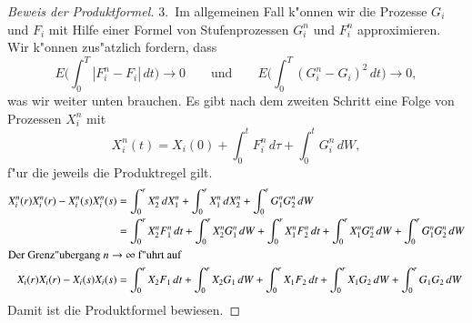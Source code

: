 \begin{proof}[Beweis der Produktformel]
3.~Im allgemeinen Fall k"onnen wir die Prozesse $G_i$ und $F_i$ mit Hilfe
einer Formel von Stufenprozessen $G_i^n$ und $F_i^n$ approximieren.
Wir k"onnen zus"atzlich fordern, dass
\[
E\biggl(\int_0^T |F_i^n-F_i|\,dt\biggr)\to 0
\qquad\text{und}\qquad
E\biggl(\int_0^T (G_i^n-G_i)^2\,dt\biggr)\to 0,
\]
was wir weiter unten brauchen.
Es gibt nach dem zweiten Schritt eine Folge von Prozessen $X_i^n$ mit
\[
X_i^n(t) = X_i(0) + \int_0^t F_i^n\,d\tau + \int_0^t G_i^n\,dW,
\]
f"ur die jeweils die Produktregel gilt.
\begin{align*}
X_i^n(r)X_i^n(r)-X_i^n(s)X_i^n(s)
&=
\int_0^r X_2^n\,dX_1^n+\int_0^r X_1^n\,dX_2^n + \int_0^r G_1^nG_2^n\,dW
\\
&=
\int_0^r X_2^nF_1^n\,dt
+
\int_0^r X_2^nG_1^n\,dW
+
\int_0^r X_1^nF_2^n\,dt
+
\int_0^r X_1^nG_2^n\,dW
+
\int_0^r G_1^nG_2^n\,dW
\\
\intertext{Der Grenz"ubergang $n\to\infty$ f"uhrt auf}
X_i(r)X_i(r)-X_i(s)X_i(s)
&=
\int_0^r X_2F_1\,dt
+
\int_0^r X_2G_1\,dW
+
\int_0^r X_1F_2\,dt
+
\int_0^r X_1G_2\,dW
+
\int_0^r G_1G_2\,dW
\end{align*}
Damit ist die Produktformel bewiesen.
\end{proof}

